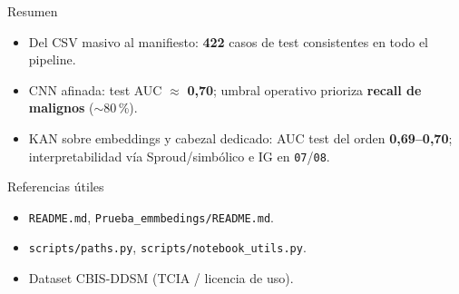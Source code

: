 \documentclass[aspectratio=169,spanish]{beamer}
\begin{document}
\begin{frame}{Resumen}
  \begin{itemize}
    \item Del CSV masivo al manifiesto: \textbf{422} casos de test consistentes en todo el pipeline.
    \item CNN afinada: test AUC $\approx$ \textbf{0{,}70}; umbral operativo prioriza \textbf{recall de malignos} ($\sim$80\,\%).
    \item KAN sobre embeddings y cabezal dedicado: AUC test del orden \textbf{0{,}69--0{,}70}; interpretabilidad vía Sproud/simbólico e IG en \texttt{07}/\texttt{08}.
  \end{itemize}
\end{frame}

\begin{frame}[allowframebreaks]{Referencias útiles}
  \begin{itemize}
    \item \texttt{README.md}, \texttt{Prueba\_emmbedings/README.md}.
    \item \texttt{scripts/paths.py}, \texttt{scripts/notebook\_utils.py}.
    \item Dataset CBIS-DDSM (TCIA / licencia de uso).
  \end{itemize}
\end{frame}
\end{document}
